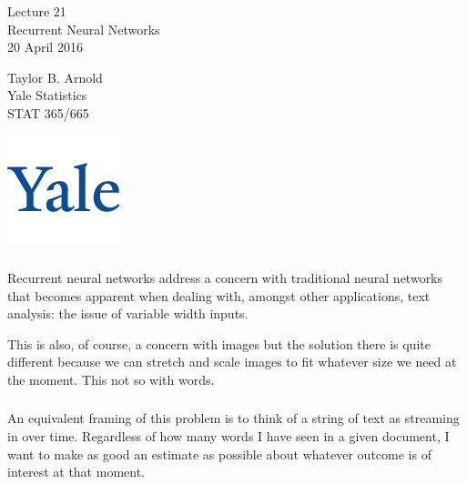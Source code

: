 \documentclass[xetex,mathserif,serif,aspectratio=169]{beamer}
\begin{document}
\begin{frame}[fragile] \frametitle{} \oldB \small

\vfill

{\fontsize{0.7cm}{0cm}\selectfont Lecture 21 \\\vspace{0.2cm}
Recurrent Neural Networks}\\\vspace{0.5cm}
20 April 2016

\vspace{2cm}

\begin{minipage}{0.6\textwidth}
Taylor B. Arnold \\
Yale Statistics \\
STAT 365/665
\end{minipage}
\hfill
\begin{minipage}{0.3\textwidth}\raggedleft
\includegraphics[scale=0.3]{../yale-logo.png}
\end{minipage}%

\end{frame}

\begin{frame}[fragile] \frametitle{} \oldB \small


Recurrent neural networks address a concern with traditional
neural networks that becomes apparent when dealing with,
amongst other applications, text analysis: the issue of
variable width inputs.

\pause This is also, of course, a concern with images but the
solution there is quite different because we can stretch and
scale images to fit whatever size we need at the moment. This
not so with words.

\end{frame}

\begin{frame}[fragile] \frametitle{} \oldB \small


An equivalent framing of this problem is to think of a string
of text as streaming in over time. Regardless of how many words
I have seen in a given document, I want to make as good an
estimate as possible about whatever outcome is of interest at
that moment.

\end{frame}
\end{document}
